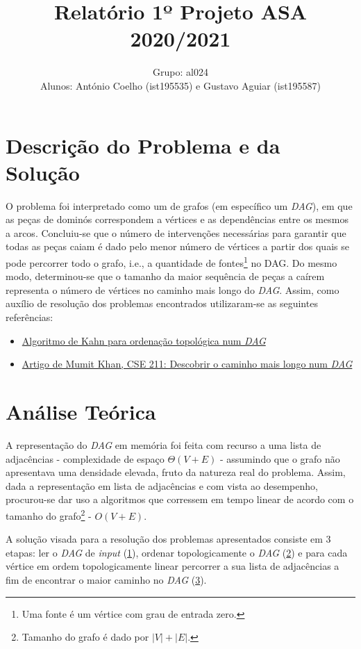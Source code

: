 \documentclass[12pt]{article}
\author{
	Grupo: al024\\Alunos: António Coelho (ist195535) e Gustavo Aguiar (ist195587)
}
\title{\vspace{-2cm}Relatório 1º Projeto ASA 2020/2021}
\date{}
\begin{document}
\maketitle
\section{Descrição do Problema e da Solução}
O problema foi interpretado como um de grafos (em específico um \emph{DAG}), em que as peças de dominós correspondem a vértices e as dependências entre os mesmos a arcos. Concluiu-se que o número de intervenções necessárias para garantir que todas as peças caiam é dado pelo menor número de vértices a partir dos quais se pode percorrer todo o grafo, i.e., a quantidade de fontes\footnote{Uma fonte é um vértice com grau de entrada zero.} no DAG. Do mesmo modo, determinou-se que o tamanho da maior sequência de peças a caírem representa o número de vértices no caminho mais longo do \emph{DAG}.
Assim, como auxílio de resolução dos problemas encontrados utilizaram-se as seguintes referências:
\begin{itemize}
\item\href{https://www.geeksforgeeks.org/topological-sorting-indegree-based-solution/}{Algoritmo de Kahn para ordenação topológica num \emph{DAG}}
\item\href{https://www.mathcs.emory.edu/~cheung/Courses/171/Syllabus/11-Graph/Docs/longest-path-in-dag.pdf}{Artigo de Mumit Khan, CSE 211: Descobrir o caminho mais longo num \emph{DAG}}
\end{itemize}
 
 \section{Análise Teórica}
A representação do \emph{DAG} em memória foi feita com recurso a uma lista de adjacências - complexidade de espaço $\Theta{(V+E)}$ - assumindo que o grafo não apresentava uma densidade elevada, fruto da natureza real do problema. Assim, dada a representação em lista de adjacências e com vista ao desempenho, procurou-se dar uso a algoritmos que corressem em tempo linear de acordo com o tamanho do grafo\footnote{Tamanho do grafo é dado por \href{https://bit.ly/3gfDEJJ}{$\left|V\right|+\left|E\right|$}.} - $O(V+E)$.

A solução visada para a resolução dos problemas apresentados consiste em 3 etapas: ler o \emph{DAG} de \emph{input} (\underline{1}), ordenar topologicamente o \emph{DAG} (\underline{2}) e para cada vértice em ordem topologicamente linear percorrer a sua lista de adjacências a fim de encontrar o maior caminho no \emph{DAG} (\underline{3}).
\end{document}
